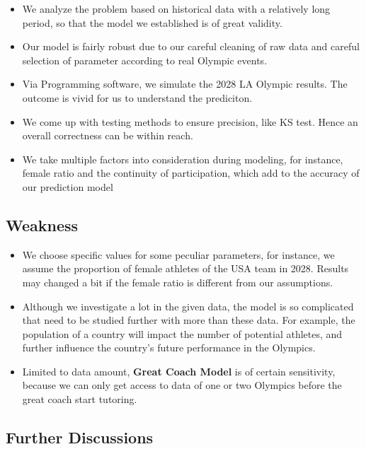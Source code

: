 \begin{itemize}
\item We analyze the problem based on historical data with a relatively long period, so that the model we established is of great validity.

\item Our model is fairly robust due to our careful cleaning of raw data and careful selection of parameter according to real Olympic events.

\item Via Programming software, we simulate the 2028 LA Olympic results. The outcome is vivid for us to understand the prediciton.

\item We come up with testing methods to ensure precision, like KS test. Hence an overall correctness can be within reach.

\item We take multiple factors into consideration during modeling, for instance, female ratio and the continuity of participation, which add to the accuracy of our prediction model
\end{itemize}

\subsection{Weakness}

\begin{itemize}
\item We choose specific values for some peculiar parameters, for instance, we assume the proportion of female athletes of the USA team in 2028. Results may changed a bit if the female ratio is different from our assumptions.

\item Although we investigate a lot in the given data, the model is so complicated that need to be studied further with more than these data. For example, the population
of a country will impact the number of potential athletes, and further influence the country's future performance in the Olympics.

\item Limited to data amount, \textbf{Great Coach Model} is of certain sensitivity, because we can only get access to data of one or two Olympics before the great coach start tutoring.
\end{itemize}

\subsection{Further Discussions}
